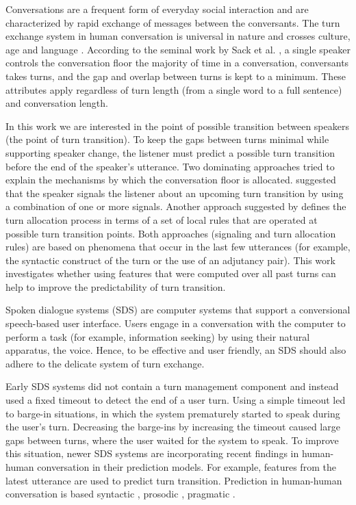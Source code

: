 Conversations are a frequent form of everyday social interaction and are characterized by rapid exchange of messages between the conversants.
The turn exchange system in human conversation is universal in nature and crosses culture, age and language \cite{levinson2016turn}. According to the
seminal work by Sack et al. \cite{sacks1974simplest}, a single speaker controls the conversation floor the majority of time in a conversation, conversants takes turns, and the gap and overlap between turns is kept to a minimum. These attributes apply regardless of turn length (from a single word to a full sentence) and conversation length.

In this work we are interested in the point of possible transition between speakers (the point of turn transition). To keep the gaps between turns minimal while supporting speaker change, the listener
must predict a possible turn transition before the end of the speaker's utterance. Two dominating approaches tried to explain the mechanisms by which
the conversation floor is allocated. \cite{duncan1972some} suggested that the speaker signals the listener about an upcoming turn transition by using a combination of one or more signals.
Another approach suggested by \cite{sacks1974simplest} defines the turn allocation process in terms of a set of local rules that are operated at possible turn transition points.
Both approaches (signaling and turn allocation rules) are based on phenomena that occur in the last few utterances (for example, the syntactic construct of the turn or the use of an adjutancy pair). This work investigates whether using features that were computed over all past turns can help to improve the predictability of turn transition.

Spoken dialogue systems (SDS) are computer systems that support a conversional speech-based user interface. Users engage in a conversation with the computer to
perform a task (for example, information seeking) by using their natural apparatus, the voice. Hence, to be effective and user friendly, an SDS should also adhere to the delicate system of turn exchange.

Early SDS systems did not contain a turn management component and instead used a fixed timeout to detect the end of a user turn. Using a simple timeout led to barge-in situations, in which the system prematurely started to speak during the user's turn. Decreasing the barge-ins by increasing the timeout caused large gaps between turns, where the user waited for the system to speak.
To improve this situation, newer SDS systems are incorporating recent findings in human-human conversation in their prediction models. For example, features from the latest utterance are used to predict turn transition. Prediction in human-human conversation is based syntactic \cite{sacks1974simplest,de2006projecting}, prosodic  \cite{ford1996interactional,stolcke2002speaker,ferrer2003prosody}, pragmatic \cite{ford2001intersection}.

